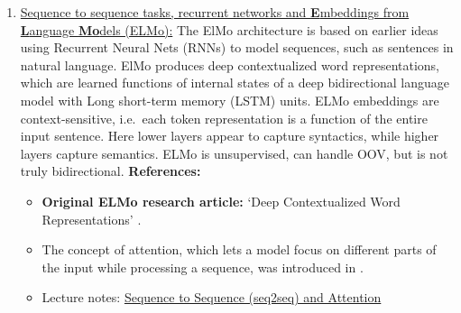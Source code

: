 \documentclass[11pt, a4paper]{amsart}
\begin{document}
\begin{enumerate}[resume]
    \item \underline{Sequence to sequence tasks, recurrent networks and \textbf{E}mbeddings from \textbf{L}anguage \textbf{Mo}dels (ELMo):}
    \newline
    The ElMo architecture is based on earlier ideas using Recurrent Neural Nets (RNNs) to model sequences, such as sentences in natural language.
    ElMo produces deep contextualized word representations, which are learned functions of internal states of a deep bidirectional language model with Long short-term memory (LSTM) units.
    ELMo embeddings are context-sensitive, i.e.\ each token representation is a function of the entire input sentence.
    Here lower layers appear to capture syntactics, while higher layers capture semantics.
    ELMo is unsupervised, can handle OOV, but is not truly bidirectional.
    \newline
    \textbf{References:}
    \begin{itemize}
        \item \textbf{Original ELMo research article:} `Deep Contextualized Word Representations' \cite{DBLP:journals/corr/abs-1802-05365}.
        \item The concept of attention, which lets a model focus on different parts of the input while processing a sequence, was introduced in \cite{garg-etal-2019-jointly}.
        \item Lecture notes: \href{https://lena-voita.github.io/nlp_course/seq2seq_and_attention.html}{Sequence to Sequence (seq2seq) and Attention}
    \end{itemize}
    

\end{enumerate}
\end{document}
